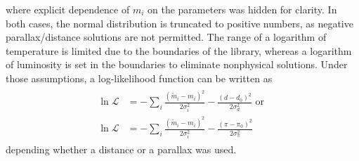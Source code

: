 \documentclass{pracalicmgr}
\begin{document}
where explicit dependence of $m_i$ on the parameters was hidden for clarity. In both cases, the normal distribution is truncated to positive numbers, as
negative parallax/distance solutions are not permitted. The range of a logarithm of temperature is limited due to the boundaries of the library, whereas a logarithm of luminosity is
set in the boundaries to eliminate nonphysical solutions.
Under those assumptions, a log-likelihood function can be written as 
\begin{align}
    \begin{split}
    \ln{\mathcal{L}} &= -\sum_i\frac{(\tilde{m}_i-m_i)^2}{2\sigma_i^2}-\frac{(d-d_0)^2}{2\sigma_d^2} \textrm{ or }\\
    \ln{\mathcal{L}} &= -\sum_i\frac{(\tilde{m}_i-m_i)^2}{2\sigma_i^2}-\frac{(\pi-\pi_0)^2}{2\sigma_{\pi}^2}
    \end{split}
\end{align} depending whether a distance or a parallax was used. 
\end{document}
